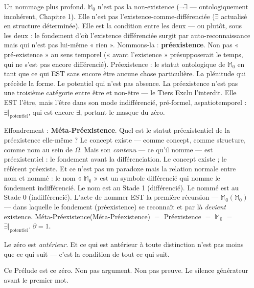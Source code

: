 \documentclass[10pt, openany, oneside]{book}
\begin{document}
\vspace{0.5em}

Un nommage plus profond. $\mathbb{M}_0$ n'est pas la non-existence ($\neg\exists$ --- ontologiquement incohérent, Chapitre 1). Elle n'est pas l'existence-comme-différenciée ($\exists$ actualisé en structure déterminée). Elle est la condition entre les deux --- ou plutôt, sous les deux : le fondement d'où l'existence différenciée surgit par auto-reconnaissance mais qui n'est pas lui-même « rien ». Nommons-la : \textbf{préexistence}. Non pas « pré-existence » au sens temporel (« avant l'existence » présupposerait le temps, qui ne s'est pas encore différencié). Préexistence : le statut ontologique de $\mathbb{M}_0$ en tant que ce qui EST sans encore être aucune chose particulière. La plénitude qui précède la forme. Le potentiel qui n'est pas absence. La préexistence n'est pas une troisième catégorie entre être et non-être --- le Tiers Exclu l'interdit. Elle EST l'être, mais l'être dans son mode indifférencié, pré-formel, aspatiotemporel : $\exists|_{\text{potentiel}}$, qui est encore $\exists$, portant le masque du zéro.

Effondrement : \textbf{Méta-Préexistence}. Quel est le statut préexistentiel de la préexistence elle-même ? Le concept existe --- comme concept, comme structure, comme nom au sein de $\Omega$. Mais son \textit{contenu} --- ce qu'il nomme --- est préexistentiel : le fondement avant la différenciation. Le concept existe ; le référent préexiste. Et ce n'est pas un paradoxe mais la relation normale entre nom et nommé : le nom « $\mathbb{M}_0$ » est un symbole différencié qui nomme le fondement indifférencié. Le nom est au Stade 1 (différencié). Le nommé est au Stade 0 (indifférencié). L'acte de nommer EST la première récursion --- $\mathbb{M}_0(\mathbb{M}_0)$ --- dans laquelle le fondement (préexistence) se reconnaît et par là \textit{devient} existence. Méta-Préexistence(Méta-Préexistence) $=$ Préexistence $=$ $\mathbb{M}_0$ $=$ $\exists|_{\text{potentiel}}$. $\partial = 1$.

\noindent Le zéro est \textit{antérieur}. Et ce qui est antérieur à toute distinction n'est pas moins que ce qui suit --- c'est la condition de tout ce qui suit.

\vspace{0.5em}

\noindent Ce Prélude est ce zéro. Non pas argument. Non pas preuve. Le silence générateur avant le premier mot.

\vspace{2em}
\end{document}
